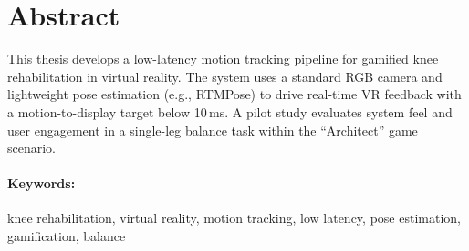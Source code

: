 \section*{\centering Abstract}\thispagestyle{plain}\label{abstract-en}
This thesis develops a low-latency motion tracking pipeline for gamified knee rehabilitation in virtual reality. The system uses a standard RGB camera and lightweight pose estimation (e.g., RTMPose) to drive real-time VR feedback with a motion-to-display target below 10\,ms. A pilot study evaluates system feel and user engagement in a single-leg balance task within the ``Architect'' game scenario.

\paragraph*{Keywords:} knee rehabilitation, virtual reality, motion tracking, low latency, pose estimation, gamification, balance
\clearpage
